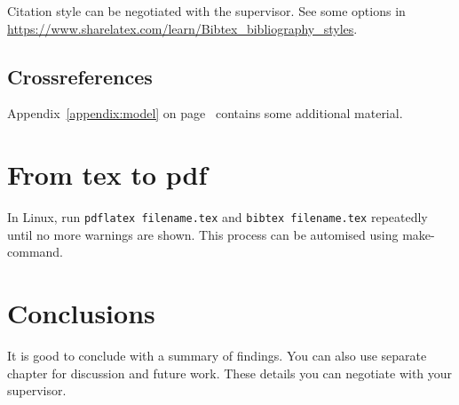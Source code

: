 Citation style can be negotiated with the supervisor. See some options in \url{https://www.sharelatex.com/learn/Bibtex_bibliography_styles}.

\section{Crossreferences}

Appendix~\ref{appendix:model} on page~\pageref{appendix:model} contains some additional material.

\chapter{From tex to pdf}

In Linux, run \texttt{pdflatex filename.tex} and \texttt{bibtex filename.tex} repeatedly until no more warnings are shown. This process can be automised using make-command.
 
\chapter{Conclusions\label{chapter:conclusions}}

It is good to conclude with a summary of findings. You can also use separate chapter for discussion and future work. These details you can negotiate with your supervisor.